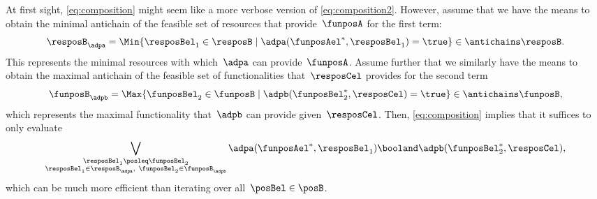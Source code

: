 \begin{remark}
    At first sight, \cref{eq:composition} might seem like a more verbose version of \cref{eq:composition2}.
    However, assume that we have the means to obtain the minimal antichain of the feasible set of resources that provide~$\funposA$ for the first term:
    \begin{equation*}
        \resposB_\adpa = \Min \{\resposBel_1\in \resposB \mid \adpa(\funposAel^*,\resposBel_1)=\true\} \in \antichains \resposB.
    \end{equation*}
    This represents the minimal resources with which~$\adpa$ can provide~$\funposA$.
    Assume further that we similarly have the means to obtain the maximal antichain of the feasible set of functionalities that~$\resposCel$ provides for the second term
    \begin{equation*}
        \funposB_\adpb = \Max \{\funposBel_2\in \funposB \mid \adpb(\funposBel_2^*,\resposCel)=\true\} \in \antichains \funposB,
    \end{equation*}
    which represents the maximal functionality that~$\adpb$ can provide given~$\resposCel$.
    Then, \cref{eq:composition} implies that it suffices to only evaluate
    \begin{equation*}
        \bigvee_{\substack{\resposBel_1\posleq\funposBel_2 \\ \resposBel_1\in \resposB_\adpa,~ \funposBel_2\in\funposB_\adpb }} \adpa(\funposAel^*,\resposBel_1) \booland \adpb(\funposBel_2^*,\resposCel),
    \end{equation*}
    which can be much more efficient than iterating over all~$\posBel\in \posB$.
\end{remark}


